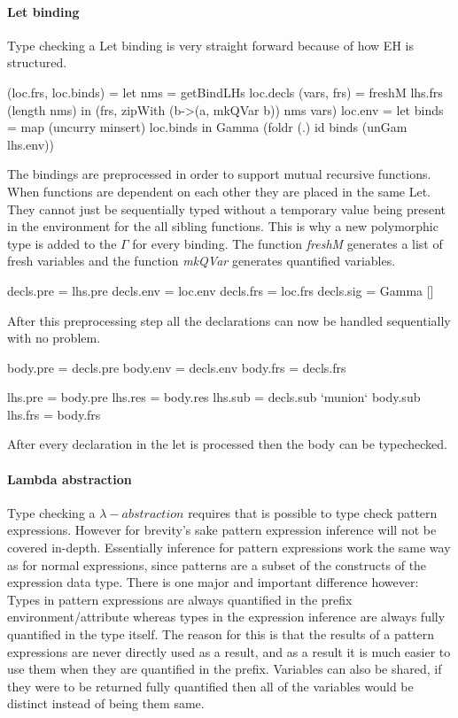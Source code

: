 \paragraph{Let binding}
Type checking a Let binding is very straight forward because of how EH is structured.

\begin{code}
(loc.frs, loc.binds)  =  let  nms          = getBindLHs loc.decls
                              (vars, frs)  = freshM lhs.frs (length nms)
                         in (frs, zipWith (\a b->(a, mkQVar b)) nms vars)
loc.env   =  let binds = map (uncurry minsert) loc.binds 
             in Gamma (foldr (.) id binds (unGam lhs.env))
\end{code}
The bindings are preprocessed in order to support mutual recursive functions. When functions are dependent on each other they are placed in the same Let. They cannot just be sequentially typed without a temporary value being present in the environment for the all sibling functions. This is why a new polymorphic type is added to the $\Gamma$ for every binding. The function \emph{freshM} generates a list of fresh variables and the function \emph{mkQVar} generates quantified variables.

\begin{code}
decls.pre  = lhs.pre
decls.env  = loc.env
decls.frs  = loc.frs
decls.sig  = Gamma []
\end{code}
After this preprocessing step all the declarations can now be handled sequentially with no problem.

\begin{code}
body.pre  = decls.pre
body.env  = decls.env 
body.frs  = decls.frs

lhs.pre   = body.pre
lhs.res   = body.res
lhs.sub   = decls.sub `munion` body.sub
lhs.frs   = body.frs
\end{code}
After every declaration in the let is processed then the body can be typechecked.

\paragraph{Lambda abstraction}
Type checking a $\lambda-abstraction$ requires that is possible to type check pattern expressions. However for brevity's sake pattern expression inference will not be covered in-depth. Essentially inference for pattern expressions work the same way as for normal expressions, since patterns are a subset of the constructs of the expression data type. There is one major and important difference however: Types in pattern expressions are always quantified in the prefix environment/attribute whereas types in the expression inference are always fully quantified in the type itself. The reason for this is that the results of a pattern expressions are never directly used as a result, and as a result it is much easier to use them when they are quantified in the prefix. Variables can also be shared, if they were to be returned fully quantified then all of the variables would be distinct instead of being them same.

